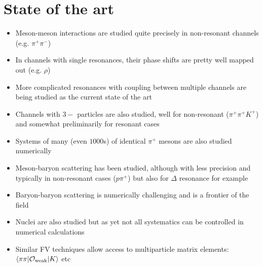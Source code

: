   	
\section{State of the art}
\begin{itemize}
    \item Meson-meson interactions are studied quite precisely in non-resonant channels (e.g. $\pi^+ \pi^-$)
    \item In channels with single resonances, their phase shifts are pretty well mapped out (e.g. $\rho$)
    \item More complicated resonances with coupling between multiple channels are being studied as the current state of the art
    \item Channels with $3-$ particles are also studied, well for non-resonant ($\pi^+ \pi^+ K^+$) and somewhat preliminarily for resonant cases
    \item Systems of many (even $1000$s) of identical $\pi^+$ mesons are also studied numerically
    \item Meson-baryon scattering has been studied, although with less precision and typically in non-resonant cases ($p \pi^+$) but also for $\Delta$ resonance for example
    \item Baryon-baryon scattering is numerically challenging and is a frontier of the field
    \item Nuclei are also studied but as yet not all systematics can be controlled in numerical calculations
    \item Similar FV techniques allow access to multiparticle matrix elements: $\langle \pi \pi | {\cal O}_{\text{weak}}|K\rangle$ etc
\end{itemize}
